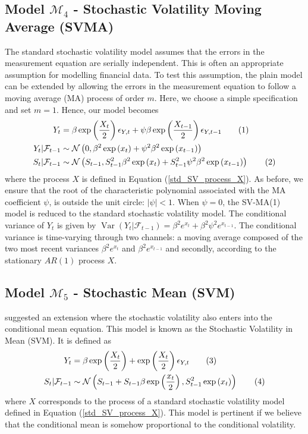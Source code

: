 \documentclass[11pt,a4,twosided,singlespacing,titlepagenumber=on]{scrreprt}
\numberwithin{equation}{chapter} %
\theoremstyle{remark}
\DeclareMathOperator{\var}{Var}
\newcommand\numberthis{\addtocounter{equation}{1}\tag{\theequation}}
\begin{document}
\subsection{Model $\mathcal{M}_4$ - Stochastic Volatility Moving Average (SVMA)}
The standard stochastic volatility model assumes that the errors in the measurement equation are serially independent. This is often an appropriate assumption for modelling financial data. To test this assumption, the plain model can be extended by allowing the errors in the measurement equation to follow a moving average (MA) process of order $m$. Here, we choose a simple specification and set $m = 1$. Hence, our model becomes
\begin{align*}
Y_t							      &= \beta \exp \left( \frac{X_t}{2} \right) \epsilon_{Y,t} + \psi \beta \exp \left( \frac{X_{t-1}}{2} \right) \epsilon_{Y,t-1} \numberthis \\
Y_t	| \mathcal{F}_{t-1}		&\sim \mathcal{N} \left(0, \beta^2 \exp \left( x_t \right) + \psi^2 \beta^2 \exp \left( x_{t-1} \right) \right) \\
S_t | \mathcal{F}_{t-1}	  &\sim \mathcal{N} \left(S_{t-1}, S_{t-1}^2 \beta^2 \exp \left( x_t \right) +  S_{t-1}^2 \psi^2 \beta^2 \exp \left( x_{t-1} \right) \right) \numberthis
\end{align*}
where the process $X$ is defined in Equation (\ref{std_SV_process_X}). As before, we ensure that the root of the characteristic polynomial associated with the MA coefficient $\psi$, is outside the unit circle: $|\psi| < 1$. When $\psi = 0$, the SV-MA(1) model is reduced to the standard stochastic volatility model. The conditional
variance of $Y_t$ is given by $\var \left(Y_t | \mathcal{F}_{t-1} \right) = \beta^2 e^{x_t} + \beta^2 \psi^2 e^{x_{t-1}}$. The conditional variance is time-varying through two channels: a moving average composed of the two most recent variances $\beta^2 e^{x_t}$ and $\beta^2 e^{x_{t-1}}$ and secondly, according to the stationary $AR(1)$ process $X$.

\subsection{Model $\mathcal{M}_5$ - Stochastic Mean (SVM)}
\cite{koopman2002} suggested an extension where the stochastic volatility also enters into the conditional mean equation. This model is known as the Stochastic Volatility in Mean (SVM). It is defined as
\begin{align*}
Y_t 			 &= \beta \exp\left(\frac{X_t}{2}\right) + \exp\left(\frac{X_t}{2}\right) \epsilon_{Y,t} \numberthis\\
S_t | \mathcal{F}_{t-1}  &\sim \mathcal{N} \left(S_{t-1} + S_{t-1} \beta \exp\left(\frac{x_t}{2}\right), S_{t-1}^2 \exp\left(x_t\right) \right) \numberthis
\end{align*}
where $X$ corresponds to the process of a standard stochastic volatility model defined in Equation (\ref{std_SV_process_X}). This model is pertinent if we believe that the conditional mean is somehow proportional to the conditional volatility.
\end{document}
